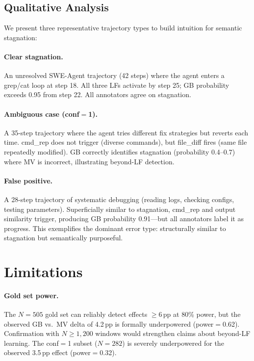 \documentclass[11pt,a4paper]{article}
\begin{document}
\subsection{Qualitative Analysis}

We present three representative trajectory types to build intuition for semantic stagnation:

\paragraph{Clear stagnation.}
An unresolved SWE-Agent trajectory (42 steps) where the agent enters a grep/cat loop at step 18. All three LFs activate by step 25; GB probability exceeds 0.95 from step 22. All annotators agree on stagnation.

\paragraph{Ambiguous case (conf${=}$1).}
A 35-step trajectory where the agent tries different fix strategies but reverts each time. cmd\_rep does not trigger (diverse commands), but file\_diff fires (same file repeatedly modified). GB correctly identifies stagnation (probability 0.4--0.7) where MV is incorrect, illustrating beyond-LF detection.

\paragraph{False positive.}
A 28-step trajectory of systematic debugging (reading logs, checking configs, testing parameters). Superficially similar to stagnation, cmd\_rep and output similarity trigger, producing GB probability 0.91---but all annotators label it as progress. This exemplifies the dominant error type: structurally similar to stagnation but semantically purposeful.

\section{Limitations}

\paragraph{Gold set power.}
The $N{=}505$ gold set can reliably detect effects $\geq$6\,pp at 80\% power, but the observed GB vs.\ MV delta of 4.2\,pp is formally underpowered (power${=}$0.62). Confirmation with $N{\geq}1{,}200$ windows would strengthen claims about beyond-LF learning. The conf${=}$1 subset ($N{=}282$) is severely underpowered for the observed 3.5\,pp effect (power${=}$0.32).
\end{document}
